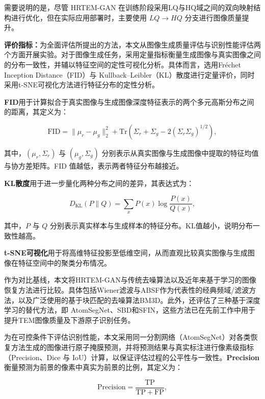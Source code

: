 需要说明的是，尽管 HRTEM-GAN 在训练阶段采用LQ与HQ域之间的双向映射结构进行优化，但在实际应用部署时，主要使用 $LQ \rightarrow HQ$ 分支进行图像质量提升。

\textbf{评价指标：}为全面评估所提出的方法，本文从图像生成质量评估与识别性能评估两个方面开展实验。对于图像生成任务，采用定量指标衡量生成图像与真实图像之间的分布一致性，并辅以特征空间的定性可视化分析。具体而言，选用Fréchet Inception Distance（FID）\cite{heusel2017gans}与 Kullback–Leibler（KL）\cite{perezcruz2008kullback}散度进行定量评价，同时采用t-SNE可视化\cite{vandermaaten2008tsne}方法进行特征分布的定性分析。

\textbf{FID}用于计算拟合于真实图像与生成图像深度特征表示的两个多元高斯分布之间的距离，其定义为：

\begin{equation}
\mathrm{FID} = \|\mu_r - \mu_g\|_2^2 + \mathrm{Tr}\left( \Sigma_r + \Sigma_g - 2(\Sigma_r \Sigma_g)^{1/2} \right),
\end{equation}

其中，$(\mu_r, \Sigma_r)$ 与 $(\mu_g, \Sigma_g)$ 分别表示从真实图像与生成图像中提取的特征均值与协方差矩阵。FID 值越低，表示两者特征分布越接近。

\textbf{KL散度}用于进一步量化两种分布之间的差异，其表达式为：

\begin{equation}
D_{\mathrm{KL}}(P \| Q) = \sum_x P(x) \log \frac{P(x)}{Q(x)},
\end{equation}

其中，$P$ 与 $Q$ 分别表示真实样本与生成样本的特征分布。KL值越小，说明分布一致性越高。

\textbf{t-SNE可视化}用于将高维特征投影至低维空间，从而直观比较真实图像与生成图像在特征空间中的聚类分布情况。

作为对比基线，本文将HRTEM-GAN与传统去噪算法以及近年来基于学习的图像恢复方法进行比较。具体包括Wiener滤波与ABSF作为代表性的经典频域/滤波方法，以及广泛使用的基于块匹配的去噪算法BM3D。此外，还评估了三种基于深度学习的替代方法，即 AtomSegNet\cite{lin2021temimagenet}、SBD\cite{mohan2022deep}和SFIN\cite{lobato2024deep}，这些方法已在先前工作中用于提升TEM图像质量及下游原子识别任务。

为在可控条件下评估识别性能，本文采用同一分割网络（AtomSegNet）对各类恢复方法生成的图像进行原子掩膜预测，并将预测结果与真实标注进行像素级指标（Precision、Dice 与 IoU）计算，以保证评估过程的公平性与一致性。\textbf{Precision}衡量预测为前景的像素中真实为前景的比例，其定义为：

\begin{equation}
\mathrm{Precision} = \frac{\mathrm{TP}}{\mathrm{TP} + \mathrm{FP}},
\end{equation}


